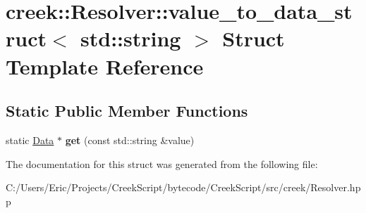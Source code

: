 \hypertarget{structcreek_1_1_resolver_1_1value__to__data__struct_3_01std_1_1string_01_4}{}\section{creek\+:\+:Resolver\+:\+:value\+\_\+to\+\_\+data\+\_\+struct$<$ std\+:\+:string $>$ Struct Template Reference}
\label{structcreek_1_1_resolver_1_1value__to__data__struct_3_01std_1_1string_01_4}
\subsection*{Static Public Member Functions}
\begin{DoxyCompactItemize}
\item 
static \hyperlink{classcreek_1_1_data}{Data} $\ast$ {\bfseries get} (const std\+::string \&value)\hypertarget{structcreek_1_1_resolver_1_1value__to__data__struct_3_01std_1_1string_01_4_afcaa9a5bb9e07d9c853d9cbfd5f2210f}{}\label{structcreek_1_1_resolver_1_1value__to__data__struct_3_01std_1_1string_01_4_afcaa9a5bb9e07d9c853d9cbfd5f2210f}

\end{DoxyCompactItemize}


The documentation for this struct was generated from the following file\+:\begin{DoxyCompactItemize}
\item 
C\+:/\+Users/\+Eric/\+Projects/\+Creek\+Script/bytecode/\+Creek\+Script/src/creek/Resolver.\+hpp\end{DoxyCompactItemize}
